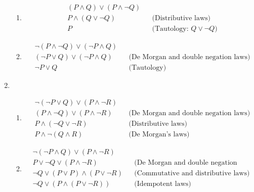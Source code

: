 \documentclass[a4paper, 11pt]{article}
\begin{document}
\begin{enumerate}
\begin{enumerate}
          \item
                \begin{align*}
                   & (P \wedge Q) \vee (P \wedge \neg Q)
                  \\ &P \wedge (Q \vee \neg Q) && \text{(Distributive laws)}
                  \\ &P &&\text{(Tautology: $Q \vee \neg Q$)}
                \end{align*}
          \item
                \begin{align*}
                   & \neg (P \wedge \neg Q) \vee (\neg P \wedge Q)                                                  \\
                   & (\neg P \vee Q) \vee (\neg P \wedge Q)        &  & \text{(De Morgan and double negation laws)} \\
                   & \neg P \vee Q                                 &  & \text{(Tautology)}
                \end{align*}
        \end{enumerate}
  \item
        \begin{enumerate}
          \item\begin{align*}
             & \neg(\neg P \vee Q) \vee (P \wedge \neg R)                                                  \\
             & (P \wedge \neg Q) \vee (P \wedge \neg R)   &  & \text{(De Morgan and double negation laws)} \\
             & P \wedge (\neg Q \vee \neg R)              &  & \text{(Distributive laws)}                  \\
             & P \wedge \neg(Q \wedge R)                  &  & \text{(De Morgan's laws)}
          \end{align*}
          \item \begin{align*}
                   & \neg (\neg P \wedge Q) \vee (P \wedge \neg R)                                                  \\
                   & P \vee \neg Q \vee (P \wedge \neg R)          &  & \text{(De Morgan and double negation laws)} \\
                   & \neg Q \vee (P \vee P) \wedge (P \vee \neg R) &  & \text{(Commutative and distributive laws)}  \\
                   & \neg Q \vee (P \wedge (P \vee \neg R))        &  & \text{(Idempotent laws)}                    \\

\end{align*}
\end{enumerate}
\end{enumerate}
\end{document}

